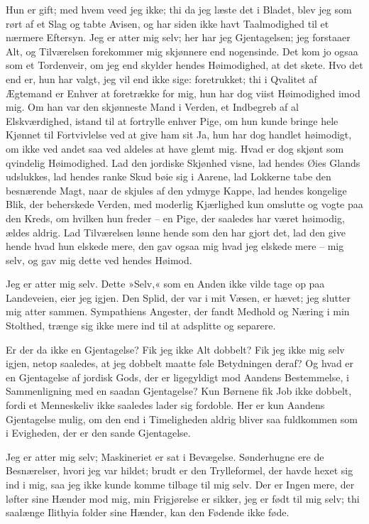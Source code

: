 \documentclass[12pt,a4paper]{article}
\begin{document}
Hun er gift; med hvem veed jeg ikke; thi da jeg læste det i Bladet, blev jeg som rørt af et Slag og tabte Avisen, og har siden ikke havt Taalmodighed til et nærmere Eftersyn. Jeg er atter mig selv; her har jeg Gjentagelsen; jeg forstaaer Alt, og Tilværelsen forekommer mig skjønnere end nogensinde. Det kom jo ogsaa som et Tordenveir, om jeg end skylder hendes Høimodighed, at det skete. Hvo det end er, hun har valgt, jeg vil end ikke sige: foretrukket; thi i Qvalitet af Ægtemand er Enhver at foretrække for mig, hun har dog viist Høimodighed imod mig. Om han var den skjønneste Mand i Verden, et Indbegreb af al Elskværdighed, istand til at fortrylle enhver Pige, om hun kunde bringe hele Kjønnet til Fortvivlelse ved at give ham sit Ja, hun har dog handlet høimodigt, om ikke ved andet saa ved aldeles at have glemt mig. Hvad er dog skjønt som qvindelig Høimodighed. Lad den jordiske Skjønhed visne, lad hendes Øies Glands udslukkes, lad hendes ranke Skud bøie sig i Aarene, lad Lokkerne tabe den besnærende Magt, naar de skjules af den ydmyge Kappe, lad hendes kongelige Blik, der beherskede Verden, med moderlig Kjærlighed kun omslutte og vogte paa den Kreds, om hvilken hun freder – en Pige, der saaledes har været høimodig, ældes aldrig. Lad Tilværelsen lønne hende som den har gjort det, lad den give hende hvad hun elskede mere, den gav ogsaa mig hvad jeg elskede mere – mig selv, og gav mig dette ved hendes Høimod.

Jeg er atter mig selv. Dette »Selv,« som en Anden ikke vilde tage op paa Landeveien, eier jeg igjen. Den Splid, der var i mit Væsen, er hævet; jeg slutter mig atter sammen. Sympathiens Angester, der fandt Medhold og Næring i min Stolthed, trænge sig ikke mere ind til at adsplitte og separere.

Er der da ikke en Gjentagelse? Fik jeg ikke Alt dobbelt? Fik jeg ikke mig selv igjen, netop saaledes, at jeg dobbelt maatte føle Betydningen deraf? Og hvad er en Gjentagelse af jordisk Gods, der er ligegyldigt mod Aandens Bestemmelse, i Sammenligning med en saadan Gjentagelse? Kun Børnene fik Job ikke dobbelt, fordi et Menneskeliv ikke saaledes lader sig fordoble. Her er kun Aandens Gjentagelse mulig, om den end i Timeligheden aldrig bliver saa fuldkommen som i Evigheden, der er den sande Gjentagelse.

Jeg er atter mig selv; Maskineriet er sat i Bevægelse. Sønderhugne ere de Besnærelser, hvori jeg var hildet; brudt er den Trylleformel, der havde hexet sig ind i mig, saa jeg ikke kunde komme tilbage til mig selv. Der er Ingen mere, der løfter sine Hænder mod mig, min Frigjørelse er sikker, jeg er født til mig selv; thi saalænge Ilithyia folder sine Hænder, kan den Fødende ikke føde.
\end{document}
